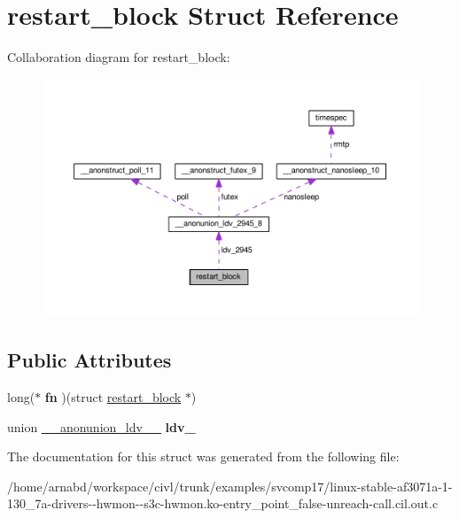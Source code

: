 \hypertarget{structrestart__block}{}\section{restart\+\_\+block Struct Reference}
\label{structrestart__block}


Collaboration diagram for restart\+\_\+block\+:
\nopagebreak
\begin{figure}[H]
\begin{center}
\leavevmode
\includegraphics[width=350pt]{structrestart__block__coll__graph}
\end{center}
\end{figure}
\subsection*{Public Attributes}
\begin{DoxyCompactItemize}
\item 
\hypertarget{structrestart__block_ae3bf63c2fc81e23d79efb26210cb333b}{}long($\ast$ {\bfseries fn} )(struct \hyperlink{structrestart__block}{restart\+\_\+block} $\ast$)\label{structrestart__block_ae3bf63c2fc81e23d79efb26210cb333b}

\item 
\hypertarget{structrestart__block_ae94a9756bd23e9f9ba47aad556dae1f3}{}union \hyperlink{union____anonunion__ldv__2945__8}{\+\_\+\+\_\+anonunion\+\_\+ldv\+\_\+\_} {\bfseries ldv\+\_}\label{structrestart__block_ae94a9756bd23e9f9ba47aad556dae1f3}

\end{DoxyCompactItemize}


The documentation for this struct was generated from the following file\+:\begin{DoxyCompactItemize}
\item 
/home/arnabd/workspace/civl/trunk/examples/svcomp17/linux-\/stable-\/af3071a-\/1-\/130\+\_\+7a-\/drivers-\/-\/hwmon-\/-\/s3c-\/hwmon.\+ko-\/entry\+\_\+point\+\_\+false-\/unreach-\/call.\+cil.\+out.\+c\end{DoxyCompactItemize}
